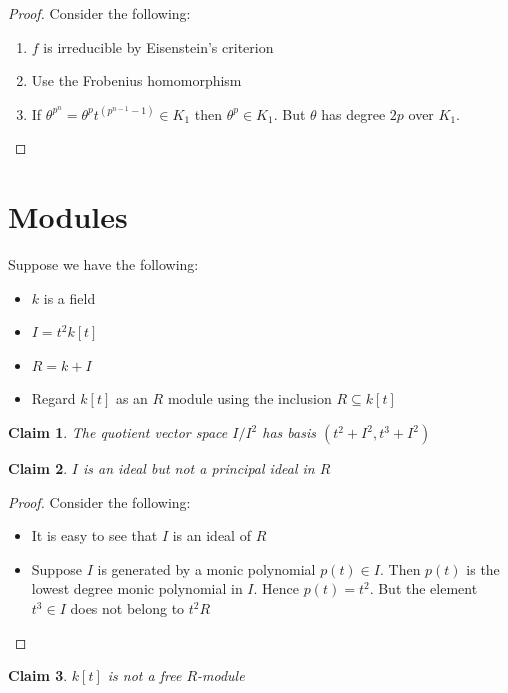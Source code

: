 \documentclass[a4paper,11pt]{article}
\newtheorem{claim}{Claim}
\begin{document}
\begin{proof}
  Consider the following:
  \begin{enumerate}
    \item $f$ is irreducible by Eisenstein's criterion
    \item Use the Frobenius homomorphism
    \item If $\theta^{p^n} = \theta^p t^{(p^{n-1}-1)} \in K_1$ then $\theta^p \in K_1$. But $\theta$ has degree $2p$ over $K_1$.
  \end{enumerate}
  
\end{proof}

\section{Modules}

Suppose we have the following:
\begin{itemize}
  \item $k$ is a field
  \item $I=t^2k[t]$
  \item $R=k+I$
  \item Regard $k[t]$ as an $R$ module using the inclusion $R \subseteq k[t]$
\end{itemize}

\begin{claim}
  The quotient vector space $I/I^2$ has basis $(t^2 + I^2,t^3 + I^2)$
\end{claim}

\begin{claim}
  $I$ is an ideal but not a principal ideal in $R$
\end{claim}

\begin{proof}
  Consider the following:
  \begin{itemize}
    \item It is easy to see that $I$ is an ideal of $R$
    \item Suppose $I$ is generated by a monic polynomial $p(t) \in I$. Then $p(t)$ is the lowest degree monic polynomial in $I$. 
    Hence $p(t)=t^2$. But the element $t^3 \in I$ does not belong to $t^2R$
  \end{itemize}
\end{proof}

\begin{claim}
  $k[t]$ is not a free $R$-module
\end{claim}
\end{document}
